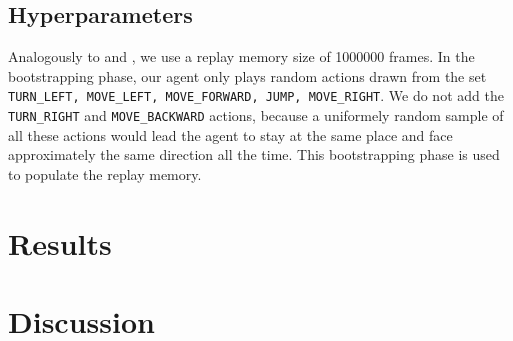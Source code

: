 \documentclass[letterpaper]{article}
\begin{document}
\subsection{Hyperparameters}
Analogously to \cite{Mnih2015} and \cite{Lample2016}, we use a replay memory size of 1000000 frames. In the bootstrapping phase, our agent only plays random actions drawn from the set \texttt{TURN\_LEFT, MOVE\_LEFT, MOVE\_FORWARD, JUMP, MOVE\_RIGHT}. We do not add the \texttt{TURN\_RIGHT} and \texttt{MOVE\_BACKWARD} actions, because a uniformely random sample of all these actions would lead the agent to stay at the same place and face approximately the same direction all the time. This bootstrapping phase is used to populate the replay memory.


\section{Results}

\section{Discussion}


\footnotesize


\end{document}
